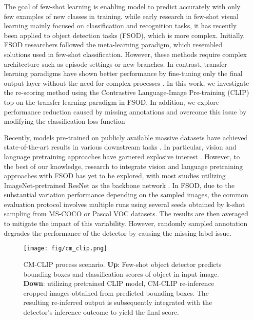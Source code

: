\documentclass{article}
\begin{document}
The goal of few-shot learning is enabling model to predict accurately with only few examples of new classes in training. while early research in few-shot visual learning mainly focused on classification \cite{siam, closer, metasgd,matching} and recognition tasks, it has recently been applied to object detection tasks (FSOD), which is more complex. Initially, FSOD researchers \cite{metayolo, metarcnn} followed the meta-learning paradigm, which resembled solutions used in few-shot classification. However, these methods require complex architecture such as episode settings or new branches. In contrast, transfer-learning paradigms have shown better performance by fine-tuning only the final output layer without the need for complex processes \cite{defrcn,tfa,dcf}. 
In this work, we investigate the re-scoring method using the Contrastive Language-Image Pre-training (CLIP) \cite{clip} top on the transfer-learning paradigm in FSOD.
In addition, we explore performance reduction caused by missing annotations and overcome this issue by modifying the classification loss function

Recently, models pre-trained on publicly available massive datasets have achieved state-of-the-art results in various downstream tasks \cite{beit,eva}. 
In particular, vision and language pretraining approaches have garnered explosive interest \cite{clip, vilbert}. 
However, to the best of our knowledge, research to integrate vision and language pretraining approaches with FSOD has yet to be explored, with most studies utilizing ImageNet-pretrained ResNet as the backbone network \cite{tfa, defrcn, dcf}.
In FSOD, due to the substantial variation performance depending on the sampled images, the common evaluation protocol involves multiple runs using several seeds obtained by k-shot sampling from MS-COCO or Pascal VOC datasets. The results are then averaged to mitigate the impact of this variability.
However, randomly sampled annotation degrades the performance of the detector by causing the missing label issue.

\begin{figure}[!t]
    \centering
    \texttt{[image: fig/cm\_clip.png]}
    \caption{CM-CLIP process scenario. \textbf{Up}: Few-shot object detector predicts bounding boxes and classification scores of object in input image. \textbf{Down}: utilizing pretrained CLIP model, CM-CLIP re-inference cropped images obtained from predicted bounding boxes. The resulting re-inferred output is subsequently integrated with the detector's inference outcome to yield the final score.}
    \label{fig:cmclip0}
\end{figure}
\end{document}
